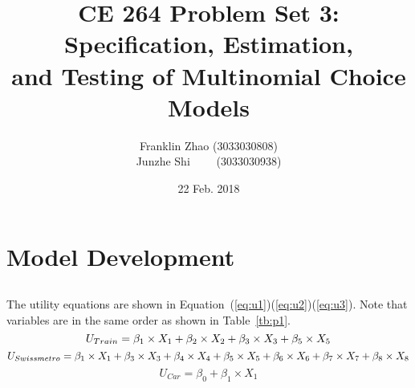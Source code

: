 \documentclass[11pt]{article}
\title{CE 264 Problem Set 3: Specification, Estimation, \\and Testing of Multinomial Choice Models}
\date{22 Feb. 2018}
\author{Franklin Zhao (3033030808)\\ Junzhe Shi \ \ \ \  (3033030938)}
\begin{document}
	
	\maketitle
	\renewcommand\theequation{\arabic{equation}}
	\renewcommand{\figurename}{Fig.}
	\renewcommand\thesection{Part \arabic{section}}
	\renewcommand\thesubsection{Question \arabic{subsection}:}
	\onehalfspacing	
\section{Model Development}
\subsection{}
The utility equations are shown in Equation~(\ref{eq:u1})(\ref{eq:u2})(\ref{eq:u3}). Note that variables are in the same order as shown in Table~\ref{tb:p1}.
\vspace{-12pt}
\begin{equation}\label{eq:u1}
\vspace{-12pt}
U_{Train}=\beta_1\times X_1 + \beta_2\times X_2 +\beta_3\times X_3+\beta_5\times X_5
\end{equation}
\begin{equation}\label{eq:u2}
\vspace{-8pt}
U_{Swissmetro}=\beta_1\times X_1 +\beta_3\times X_3+\beta_4\times X_4+\beta_5\times X_5+\beta_6\times X_6+\beta_7\times X_7+\beta_8\times X_8
\end{equation}
\begin{equation}\label{eq:u3}
U_{Car}=\beta_0+\beta_1\times X_1
\end{equation}
\end{document}
